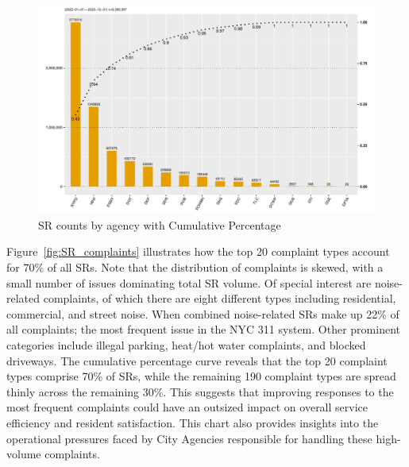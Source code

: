 \documentclass[linenumber]{jdsart}
\begin{document}
\begin{figure}[tbp]
	\centering
	\includegraphics[width = \textwidth]{SRs_by_Agency.pdf}
  	\caption{SR counts by agency with Cumulative Percentage}
	\label{fig:SRcountbyAgency}
\end{figure}

Figure~\ref{fig:SR_complaints}
illustrates how the top 20 complaint types account for 70\% 
of all SRs. Note that the distribution of complaints is skewed, 
with a small number of issues dominating total SR volume. 
Of special interest are noise\mbox{-}related complaints, of which there are eight different
types including residential, commercial, and 
street noise. When combined noise\mbox{-}related SRs make up 22\% of all 
complaints; the most frequent issue in the NYC 311 system. 
Other prominent categories include illegal parking, heat/hot water 
complaints, and blocked driveways. The cumulative percentage curve 
reveals that the top 20 complaint types comprise 70\% of SRs,
while the remaining 190 complaint types are spread thinly 
across the remaining 30\%. This suggests that improving 
responses to the most frequent complaints could have an 
outsized impact on overall service efficiency and resident 
satisfaction. This chart also provides insights into the 
operational pressures faced by City Agencies 
responsible for handling these high-volume complaints.
\end{document}
